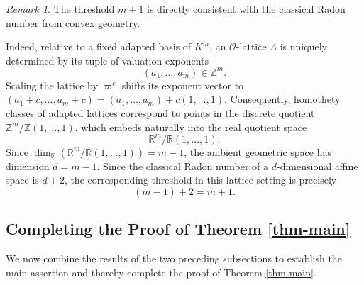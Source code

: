 \documentclass[12pt]{amsart}
\theoremstyle{definition}
\theoremstyle{remark}
\newtheorem{rmk}[theorem]{Remark}
\begin{document}
\begin{rmk}
\label{rmk:radon-number}
The threshold $m+1$ is directly consistent with the classical Radon number from convex geometry. 

Indeed, relative to a fixed adapted basis of $K^m$, an  $\mathcal{O}$-lattice $\Lambda$ is uniquely determined by its tuple of valuation exponents
\[
    (a_1, \dots, a_m) \in \mathbb{Z}^m.
\]
Scaling the lattice by $\varpi^c$ shifts its exponent vector to $(a_1 + c, \dots, a_m + c) = (a_1, \dots, a_m) + c(1, \dots, 1)$. Consequently, homothety classes of adapted lattices correspond to points in the discrete quotient $\mathbb{Z}^m / \mathbb{Z}(1, \dots, 1)$, which embeds naturally into the real quotient space
\[
    \mathbb{R}^m / \mathbb{R}(1, \dots, 1).
\]
Since $\dim_{\mathbb{R}} \left(\mathbb{R}^m / \mathbb{R}(1, \dots, 1)\right) = m - 1$, the ambient geometric space has dimension $d = m - 1$. Since the classical Radon number of a $d$-dimensional affine space is $d + 2$, the corresponding threshold in this lattice setting is precisely
\[
    (m - 1) + 2 = m + 1.
\]
\end{rmk}

\subsection{Completing the Proof of Theorem \ref{thm-main}}

We now combine the results of the two preceding subsections to establish the main assertion and thereby complete the proof of Theorem \ref{thm-main}.
\end{document}
